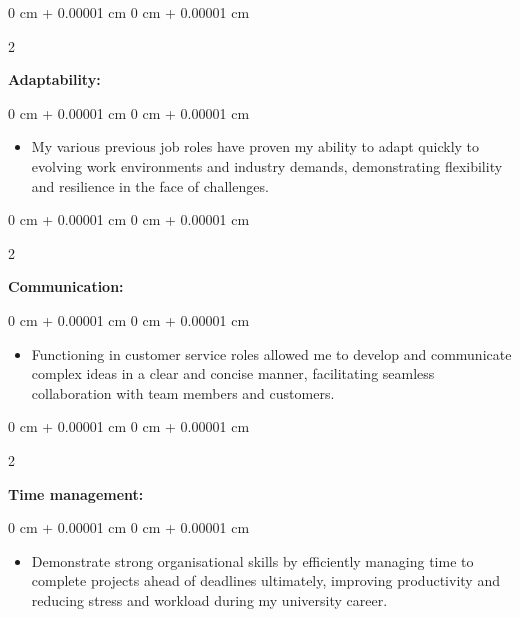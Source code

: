 \documentclass[10pt, letterpaper]{article}
\newenvironment{highlights}{
    \begin{itemize}[
        topsep=0.10 cm,
        parsep=0.10 cm,
        partopsep=0pt,
        itemsep=0pt,
        leftmargin=0 cm + 10pt
    ]
}{
    \end{itemize}
} %
\newenvironment{onecolentry}{
    \begin{adjustwidth}{
        0 cm + 0.00001 cm
    }{
        0 cm + 0.00001 cm
    }
}{
    \end{adjustwidth}
} %
\newenvironment{twocolentry}[2][]{
    \onecolentry
    \def\secondColumn{#2}
    \setcolumnwidth{\fill, 4.5 cm}
    \begin{paracol}{2}
}{
    \switchcolumn \raggedleft \secondColumn
    \end{paracol}
    \endonecolentry
} %
\begin{document}
        \begin{twocolentry}{
            
        }
            \textbf{Adaptability:}\end{twocolentry}

        \vspace{-0.05 cm}
        \begin{onecolentry}
            \begin{highlights}
                \item My various previous job roles have proven my ability to adapt quickly to evolving work environments and industry demands, demonstrating flexibility and resilience in the face of challenges. 
                
            \end{highlights}
        \end{onecolentry}
        \vspace{0.2 cm}

        \begin{twocolentry}{
            
        }
            \textbf{Communication:}\end{twocolentry}

        \vspace{-0.05 cm}
        \begin{onecolentry}
            \begin{highlights}
                \item Functioning in customer service roles allowed me to develop and communicate complex ideas in a clear and concise manner, facilitating seamless collaboration with team members and customers. 
                
            \end{highlights}
        \end{onecolentry}
              \vspace{0.2 cm}

        \begin{twocolentry}{
            
        }
            \textbf{Time management:}\end{twocolentry}

        \vspace{-0.05 cm}
        \begin{onecolentry}
            \begin{highlights}
                \item Demonstrate strong organisational skills by efficiently managing time to complete projects ahead of deadlines ultimately, improving productivity and reducing stress and workload during my university career. 
                
            \end{highlights}
        \end{onecolentry}
        

       


        
\end{document}
